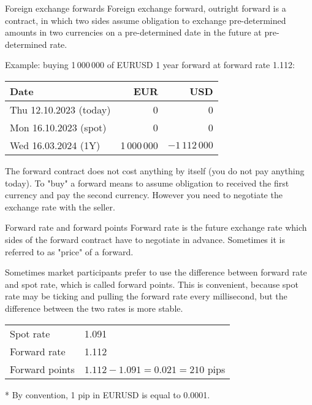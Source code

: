 \documentclass{beamer}
\begin{document}
\begin{frame}{Foreign exchange forwards}
\justify
\alert{Foreign exchange forward, outright forward} is a contract, in which two sides assume obligation to exchange pre-determined amounts in two currencies on a pre-determined date in the future at pre-determined rate. 

\justify
Example: buying 1\,000\,000 of EURUSD 1 year forward at forward rate 1.112:

\centering
\begin{tabular}{l|r|r}
Date                          & EUR & USD \\ \hline
Thu 12.10.2023 (today)  & 0   & 0   \\
Mon 16.10.2023 (spot) & 0   & 0   \\
Wed 16.03.2024 (1Y)   & 1\,000\,000 & $-1\,112\,000$
\end{tabular}

\justify
The forward contract does not cost anything by itself (you do not pay anything today). To "buy" a forward means to assume obligation to received the first currency and pay the second currency. However you need to negotiate the exchange rate with the seller.
\end{frame}



\begin{frame}{Forward rate and forward points}
\justify
\alert{Forward rate} is the future exchange rate which sides of the forward contract have to negotiate in advance. Sometimes it is
referred to as "price" of a forward.

\justify
Sometimes market participants prefer to use the difference between forward rate and spot rate, which is called \alert{forward points}. This is convenient, because spot rate may be ticking and pulling the forward rate every millisecond, but the difference between the two rates is more stable.

\vspace{\baselineskip}
\centering
\begin{tabular}{l|l}
Spot rate & 1.091 \\
Forward rate & 1.112 \\
\hline
Forward points & $1.112 - 1.091 = 0.021 = 210$ pips
\end{tabular}

\justify
* By convention, 1 pip in EURUSD is equal to 0.0001.
\end{frame}
\end{document}
